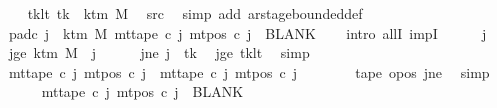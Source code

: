 \begin{isabellebody}
\isanewline
\ \ \isamarkupfalse%
\ tk{\isacharunderscore}{\kern0pt}lt{\isacharcolon}{\kern0pt}\ {\isachardoublequoteopen}tk\ {\isacharless}{\kern0pt}\ k{\isacharunderscore}{\kern0pt}tm\ M{\isachardoublequoteclose}\ \isamarkupfalse%
\ src{}\ \isamarkupfalse%
\ {\isacharparenleft}{\kern0pt}simp\ add{\isacharcolon}{\kern0pt}\ ar{\isacharunderscore}{\kern0pt}stage{\isacharunderscore}{\kern0pt}bounded{\isacharunderscore}{\kern0pt}def{\isacharparenright}{\kern0pt}\isanewline
\ \ \isamarkupfalse%
\ pad{\isacharunderscore}{\kern0pt}c{}{\isacharcolon}{\kern0pt}\ {\isachardoublequoteopen}{\isasymforall}j\ {\isasymge}\ k{\isacharunderscore}{\kern0pt}tm\ M{\isachardot}{\kern0pt}\ mt{\isacharunderscore}{\kern0pt}tape\ c{}\ j\ {\isacharparenleft}{\kern0pt}mt{\isacharunderscore}{\kern0pt}pos\ c{}\ j{\isacharparenright}{\kern0pt}\ {\isacharequal}{\kern0pt}\ BLANK{}{\isachardoublequoteclose}\isanewline
\ \ \isamarkupfalse%
\ {\isacharparenleft}{\kern0pt}intro\ allI\ impI{\isacharparenright}{\kern0pt}\isanewline
\ \ \ \ \isamarkupfalse%
\ j\ \isamarkupfalse%
\ jge{\isacharcolon}{\kern0pt}\ {\isachardoublequoteopen}k{\isacharunderscore}{\kern0pt}tm\ M\ {\isasymle}\ j{\isachardoublequoteclose}\isanewline
\ \ \ \ \isamarkupfalse%
\ jne{\isacharcolon}{\kern0pt}\ {\isachardoublequoteopen}j\ {\isasymnoteq}\ tk{\isachardoublequoteclose}\ \isamarkupfalse%
\ jge\ tk{\isacharunderscore}{\kern0pt}lt\ \isamarkupfalse%
\ simp\isanewline
\ \ \ \ \isamarkupfalse%
\ {\isachardoublequoteopen}mt{\isacharunderscore}{\kern0pt}tape\ c{}\ j\ {\isacharparenleft}{\kern0pt}mt{\isacharunderscore}{\kern0pt}pos\ c{}\ j{\isacharparenright}{\kern0pt}\ {\isacharequal}{\kern0pt}\ mt{\isacharunderscore}{\kern0pt}tape\ c{\isacharprime}{\kern0pt}\ j\ {\isacharparenleft}{\kern0pt}mt{\isacharunderscore}{\kern0pt}pos\ c{\isacharprime}{\kern0pt}\ j{\isacharparenright}{\kern0pt}{\isachardoublequoteclose}\isanewline
\ \ \ \ \ \ \isamarkupfalse%
\ tape{}\ opos{}\ jne\ \isamarkupfalse%
\ simp\isanewline
\ \ \ \ \isamarkupfalse%
\ {\isachardoublequoteopen}mt{\isacharunderscore}{\kern0pt}tape\ c{}\ j\ {\isacharparenleft}{\kern0pt}mt{\isacharunderscore}{\kern0pt}pos\ c{}\ j{\isacharparenright}{\kern0pt}\ {\isacharequal}{\kern0pt}\ BLANK{}{\isachardoublequoteclose}\ \isamarkupfalse%

\end{isabellebody}
